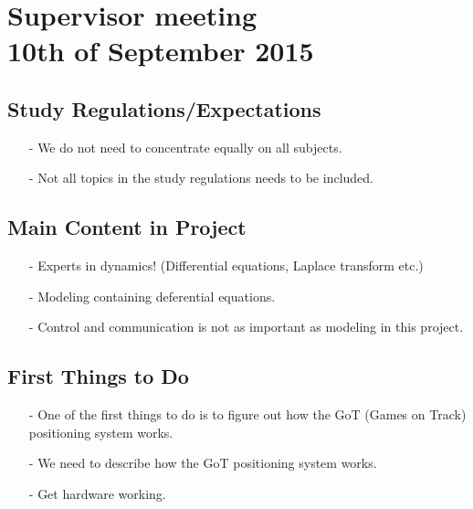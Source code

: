 

\renewcommand\chaptername{KAPITEL}
\renewcommand\contentsname{Indhold}
\renewcommand\figurename{Figur}
\renewcommand\tablename{Tabel}

\section*{Supervisor meeting\\ \small 10th of September 2015}
\subsection{Study Regulations/Expectations}
\begin{itemize}
\item[-] We do not need to concentrate equally on all subjects.
\item[-] Not all topics in the study regulations needs to be included.
\end{itemize}

\subsection{Main Content in Project}
\begin{itemize}
\item[-] Experts in dynamics! (Differential equations, Laplace transform etc.)
\item[-] Modeling containing deferential equations.
\item[-] Control and communication is not as important as modeling in this project.
\end{itemize}

\subsection{First Things to Do}
\begin{itemize}
\item[-] One of the first things to do is to figure out how the GoT (Games on Track) positioning system works.
\item[-] We need to describe how the GoT positioning system works.
\item[-] Get hardware working.
\end{itemize}

